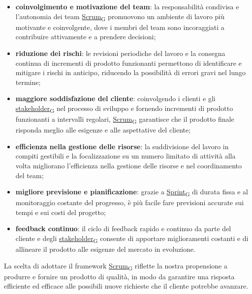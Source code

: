 \begin{itemize}
	\item \textbf{coinvolgimento e motivazione del team}: la responsabilità condivisa e l’autonomia dei team \href{https://7last.github.io/docs/pb/documentazione-interna/glossario\#scrum}{Scrum\textsubscript{G}} promuovono un ambiente di lavoro più motivante e coinvolgente, dove i membri del team sono incoraggiati a contribuire attivamente e a prendere decisioni;
	\item \textbf{riduzione dei rischi}: le revisioni periodiche del lavoro e la consegna continua di incrementi di prodotto funzionanti permettono di identificare e mitigare i rischi in anticipo, riducendo la possibilità di errori gravi nel lungo termine;
	\item \textbf{maggiore soddisfazione del cliente}: coinvolgendo i clienti e gli \href{https://7last.github.io/docs/pb/documentazione-interna/glossario\#stakeholder}{stakeholder\textsubscript{G}} nel processo di sviluppo e fornendo incrementi di prodotto funzionanti a intervalli regolari, \href{https://7last.github.io/docs/pb/documentazione-interna/glossario\#scrum}{Scrum\textsubscript{G}} garantisce che il prodotto finale risponda meglio alle esigenze e alle aspettative del cliente;
	\item \textbf{efficienza nella gestione delle risorse}: la suddivisione del lavoro in compiti gestibili e la focalizzazione su un numero limitato di attività alla volta migliorano l’efficienza nella gestione delle risorse e nel coordinamento del team;
	\item \textbf{migliore previsione e pianificazione}: grazie a \href{https://7last.github.io/docs/pb/documentazione-interna/glossario\#sprint}{Sprint\textsubscript{G}} di durata fissa e al monitoraggio costante del progresso, è più facile fare previsioni accurate sui tempi e sui costi del progetto;
	\item \textbf{feedback continuo}: il ciclo di feedback rapido e continuo da parte del cliente e degli \href{https://7last.github.io/docs/pb/documentazione-interna/glossario\#stakeholder}{stakeholder\textsubscript{G}} consente di apportare miglioramenti costanti e di allineare il prodotto alle esigenze del mercato in evoluzione.
\end{itemize}
La scelta di adottare il framework \href{https://7last.github.io/docs/pb/documentazione-interna/glossario\#scrum}{Scrum\textsubscript{G}} riflette la nostra propensione a produrre e fornire un prodotto di qualità, in modo da garantire una risposta efficiente ed efficace alle possibili nuove richieste che il cliente potrebbe avanzare.

